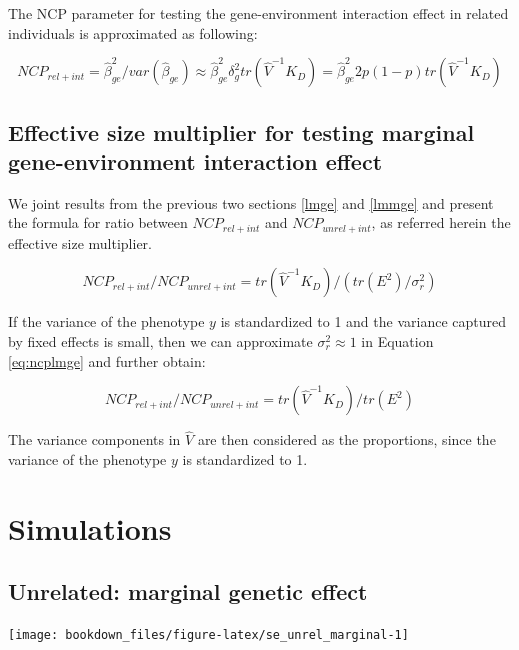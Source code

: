 \documentclass[]{book}
\theoremstyle{definition}
\theoremstyle{definition}
\theoremstyle{definition}
\theoremstyle{remark}
\begin{document}
The NCP parameter for testing the gene-environment interaction effect in
related individuals is approximated as following:

\begin{equation} 
NCP_{rel + int} = \hat{\beta}_{ge}^2 / var(\hat{\beta}_{ge}) \approx \hat{\beta}_{ge}^2 \delta_g^2 tr(\hat{V}^{-1} K_{D}) = \hat{\beta}_{ge}^2 2 p (1 - p) tr(\hat{V}^{-1} K_{D})
\label{eq:ncplmmge}
\end{equation}

\subsection{Effective size multiplier for testing marginal
gene-environment interaction effect}\label{trfge}

We joint results from the previous two sections \ref{lmge} and
\ref{lmmge} and present the formula for ratio between \(NCP_{rel+int}\)
and \(NCP_{unrel+int}\), as referred herein the effective size
multiplier.

\begin{equation} 
NCP_{rel + int} / NCP_{unrel + int} = tr(\hat{V}^{-1} K_{D}) / (tr(E^2) / \sigma^2_r)
\label{eq:ncpratioge}
\end{equation}

If the variance of the phenotype \(y\) is standardized to 1 and the
variance captured by fixed effects is small, then we can approximate
\(\sigma_r^2 \approx 1\) in Equation \eqref{eq:ncplmge} and further
obtain:

\begin{equation} 
NCP_{rel + int} / NCP_{unrel + int} = tr(\hat{V}^{-1} K_{D}) / tr(E^2)
\label{eq:ncpratiogesc}
\end{equation}

The variance components in \(\hat{V}\) are then considered as the
proportions, since the variance of the phenotype \(y\) is standardized
to 1.

\section{Simulations}\label{simulations}

\subsection{Unrelated: marginal genetic
effect}\label{unrelated-marginal-genetic-effect}

\begin{center}\texttt{[image: bookdown\_files/figure-latex/se\_unrel\_marginal-1]} \end{center}
\end{document}

